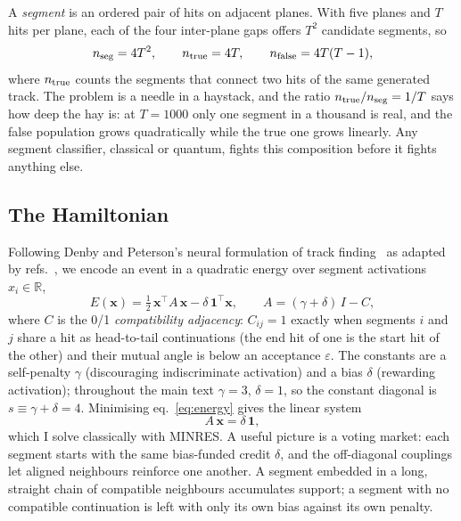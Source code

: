 \documentclass[11pt,a4paper]{article}
\begin{document}
A \emph{segment} is an ordered pair of hits on adjacent planes. With five
planes and $T$ hits per plane, each of the four inter-plane gaps offers
$T^2$ candidate segments, so
\begin{equation}
n_{\rm seg}=4T^{2},\qquad n_{\rm true}=4T,\qquad
n_{\rm false}=4T(T-1),
\label{eq:combinatorics}
\end{equation}
where $n_{\rm true}$ counts the segments that connect two hits of the
same generated track. The problem is a needle in a haystack, and the
ratio $n_{\rm true}/n_{\rm seg}=1/T$ says how deep the hay is: at
$T=1000$ only one segment in a thousand is real, and the false population
grows quadratically while the true one grows linearly. Any segment
classifier, classical or quantum, fights this composition before it
fights anything else.

\subsection{The Hamiltonian}
\label{sec:toy:ham}

Following Denby and Peterson's neural formulation of track
finding~\cite{denby1988,peterson1989} as adapted by
refs.~\cite{nicotra2023,trackhhl}, we encode an event in a quadratic
energy over segment activations $x_i\in\mathbb{R}$,
\begin{equation}
E(\mathbf{x})=\tfrac12\,\mathbf{x}^{\!\top}\!A\,\mathbf{x}
-\delta\,\mathbf{1}^{\!\top}\mathbf{x},
\qquad
A=(\gamma+\delta)\,I-C,
\label{eq:energy}
\end{equation}
where $C$ is the 0/1 \emph{compatibility adjacency}: $C_{ij}=1$ exactly
when segments $i$ and $j$ share a hit as head-to-tail continuations (the
end hit of one is the start hit of the other) and their mutual angle is
below an acceptance $\varepsilon$. The constants are a self-penalty
$\gamma$ (discouraging indiscriminate activation) and a bias $\delta$
(rewarding activation); throughout the main text $\gamma=3$, $\delta=1$,
so the constant diagonal is $s\equiv\gamma+\delta=4$. Minimising
eq.~\eqref{eq:energy} gives the linear system
\begin{equation}
A\,\mathbf{x}=\delta\,\mathbf{1},
\label{eq:linsys}
\end{equation}
which I solve classically with MINRES. A useful picture is a voting
market: each segment starts with the same bias-funded credit $\delta$,
and the off-diagonal couplings let aligned neighbours reinforce one
another. A segment embedded in a long, straight chain of compatible
neighbours accumulates support; a segment with no compatible continuation
is left with only its own bias against its own penalty.
\end{document}
